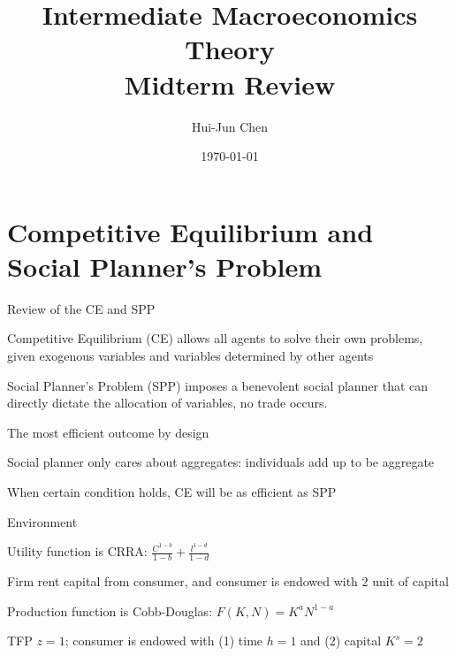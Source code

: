 \documentclass[11pt,aspectratio=169,usenames,dvipsnames]{beamer}
\title{Intermediate Macroeconomics Theory \\ \normalsize Midterm Review}
\author{Hui-Jun Chen}
\institute{The Ohio State University}
\date{\today}
\let\tempone\itemize
\let\temptwo\enditemize
\renewenvironment{itemize}{\tempone\addtolength{\itemsep}{\fill}}{\temptwo}
\let\tempa\enumerate
\let\tempb\endenumerate
\renewenvironment{enumerate}{\tempa\addtolength{\itemsep}{\fill}}{\tempb}
\begin{document}
\begin{frame}
    \titlepage
\end{frame}

\section{Competitive Equilibrium and Social Planner's Problem}
\label{sec:Competitive_Equilibrium_and_Social_Planner_s_Problem}

\begin{frame}{Review of the CE and SPP}
\label{slide:Review_of_the_CE_and_SPP}
    \begin{enumerate}
        \item Competitive Equilibrium (CE) allows all agents to solve their own problems, given \alert{exogenous variables} and \alert{variables determined by other agents}
        \item Social Planner's Problem (SPP) imposes a \alert{benevolent} social planner that can directly \alert{dictate the allocation of variables}, no trade occurs.
        \begin{itemize}
            \item The \alert{most efficient} outcome by design
            \item Social planner only cares about \alert{aggregates}: individuals add up to be aggregate
        \end{itemize}
        \item When certain condition holds, CE will be as efficient as SPP
    \end{enumerate}
\end{frame}


\begin{frame}{Environment}
\label{slide:Environment}

\begin{enumerate}
    \item Utility function is CRRA: $ \frac{C^{1-b}}{1-b} + \frac{l^{1-d}}{1-d} $
    \item Firm rent capital from consumer, and consumer is endowed with $ 2 $ unit of capital
    \item Production function is Cobb-Douglas: $ F(K, N) = K^{a} N^{1-a}$
    \item TFP $ z = 1 $; consumer is endowed with (1) time $ h = 1 $ and (2) capital $ K^{s} = 2 $
\end{enumerate}

\end{frame}
\end{document}
